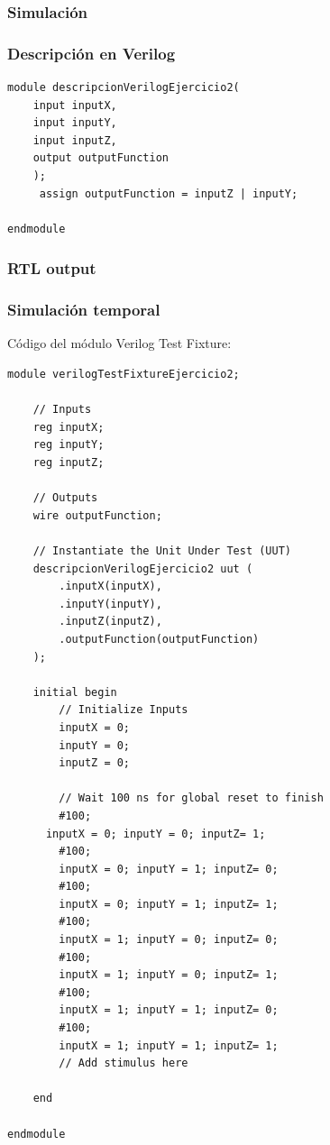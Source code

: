 \subsubsection{Simulación}
\subsubsection{Descripción en Verilog}
\begin{lstlisting}
module descripcionVerilogEjercicio2(
    input inputX,
    input inputY,
    input inputZ,
    output outputFunction
    );
	 assign outputFunction = inputZ | inputY;

endmodule

\end{lstlisting}

\subsubsection{RTL output}

\subsubsection{Simulación temporal}

\noindent Código del módulo Verilog Test Fixture:
\begin{lstlisting}
module verilogTestFixtureEjercicio2;

	// Inputs
	reg inputX;
	reg inputY;
	reg inputZ;

	// Outputs
	wire outputFunction;

	// Instantiate the Unit Under Test (UUT)
	descripcionVerilogEjercicio2 uut (
		.inputX(inputX), 
		.inputY(inputY), 
		.inputZ(inputZ), 
		.outputFunction(outputFunction)
	);

	initial begin
		// Initialize Inputs
		inputX = 0;
		inputY = 0;
		inputZ = 0;

		// Wait 100 ns for global reset to finish
		#100;
      inputX = 0; inputY = 0; inputZ= 1;
		#100;
		inputX = 0; inputY = 1; inputZ= 0;
		#100;
		inputX = 0; inputY = 1; inputZ= 1;
		#100;
		inputX = 1; inputY = 0; inputZ= 0;
		#100;
		inputX = 1; inputY = 0; inputZ= 1;
		#100;
		inputX = 1; inputY = 1; inputZ= 0;
		#100;
		inputX = 1; inputY = 1; inputZ= 1;
		// Add stimulus here

	end
      
endmodule

\end{lstlisting}
